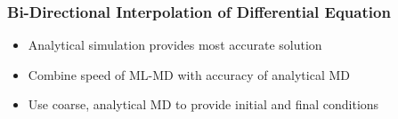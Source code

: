 \documentclass[usenames, dvipsnames, t]{beamer}
\begin{document}
\begin{frame}
	\frametitle{Bi-Directional Interpolation of Differential Equation}
	\begin{itemize}
		\item<+-> Analytical simulation provides most accurate solution
		\item<+-> Combine speed of ML-MD with accuracy of analytical MD
		\item<+-> Use coarse, analytical MD to provide initial and final conditions
	\end{itemize}
	\onslide<+->
				
		
				
				
		
		

\end{frame}
\end{document}
